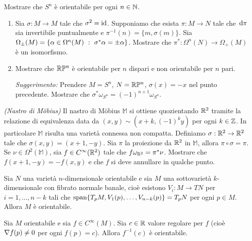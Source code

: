 \begin{exercise}
Mostrare che $S^n$ è orientabile per ogni $n\in\mathbb N$.
\end{exercise}
\begin{exercise}
	\begin{enumerate}
		\item Sia $\sigma:M\to M$ tale che $\sigma^2=\mathrm{id}$. Supponiamo che esista $\pi:M\to N$ tale che $\,\mathrm d \pi$ sia invertibile puntualmente e $\pi^{-1}(n) = \{m,\sigma(m)\}$. Sia $\Omega_\pm(M) = \{ \alpha\in\Omega^n(M) \ :\  \sigma^*\alpha = \pm\alpha \}$. Mostrare che $\pi^* : \Omega^n(N) \to \Omega_+(M)$ è un isomorfismo.
		
		\item Mostrare che $\mathbb R \mathbb P^n$ è orientabile per $n$ dispari e non orientabile per $n$ pari.
		
		\emph{Suggerimento:} Prendere $M=S^n$, $N=\mathbb R\mathbb P^n$, $\sigma(x)=-x$ nel punto precedente. Mostrare che $\sigma^*\omega_{S^n} = (-1)^{n+1} \omega_{S^n}$.
	\end{enumerate}
\end{exercise}
\begin{exercise}
	\emph{(Nastro di M\"{o}bius)} Il nastro di M\"{o}bius $\mathbb M$ si ottiene quozientando $\mathbb R^2$ tramite la relazione di equivalenza data da $(x,y) \sim (x+k,(-1)^ky)$ per ogni $k\in\mathbb Z$.  
	In particolare $\mathbb M$ risulta una varietà connessa non compatta. Definiamo $\sigma:\mathbb R^2\to\mathbb R^2$ tale che $\sigma(x,y) = (x+1,-y)$. Sia $\pi$ la proiezione da $\mathbb R^2$ in $\mathbb M$, allora $\pi\circ\sigma=\pi$.
	Se $\nu\in\Omega^2(\mathbb M)$, sia $f\in C^\infty(\mathbb R^2)$ tale che $f\omega_{\mathbb R^2} = \pi^*\nu$.
	Mostrare che $f(x+1,-y) = -f(x,y)$ e che $f$ si deve annullare in qualche punto.
\end{exercise}

\begin{proposition} 
	Sia $N$ una varietà $n$-dimensionale orientabile e sia $M$ una sottovarietà $k$-dimensionale con fibrato normale banale, cioè esistono $V_i:M\to TN$ per $i=1,\ldots,n-k$ tali che $\mathrm{span}\{ T_pM,V_1(p), \ldots, V_{n-k}(p) \} = T_pN$ per ogni $p\in M$.
	Allora $M$ è orientabile.
\end{proposition}

\begin{corollary}
	Sia $M$ orientabile e sia $f \in C^\infty(M)$. Sia $c\in\mathbb R$ valore regolare per $f$ (cioè $\nabla f (p)\not=0$ per ogni $f(p)=c$). Allora $f^{-1}(c)$ è orientabile. 
\end{corollary}


